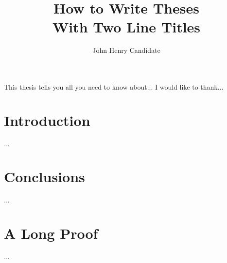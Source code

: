 \documentclass{report}
\begin{document}
    \title{How to Write Theses\\
            With Two Line Titles}
    \author{John Henry Candidate}

    \beforepreface
        This thesis tells you all you need to know about...
        I would like to thank...
    \afterpreface

    \chapter{Introduction}
         ...
    \chapter{Conclusions}
         ...
    \appendix
    \chapter{A Long Proof}
         ...
    
    
    
\end{document}

